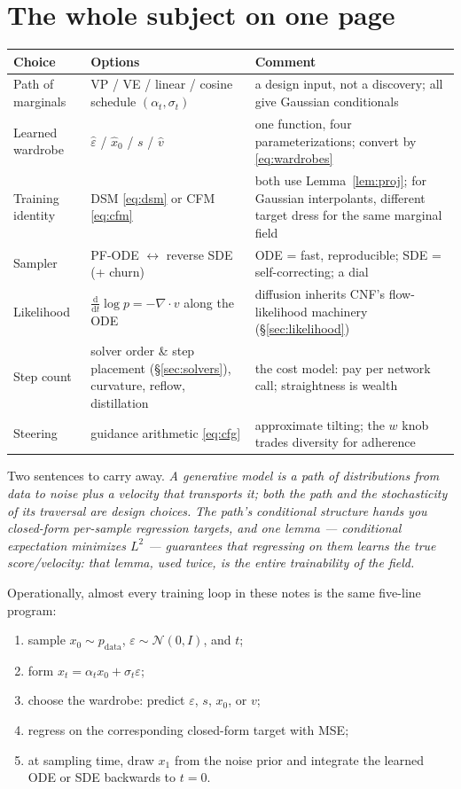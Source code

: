 \documentclass[10pt,a4paper]{article}
\newcommand{\dd}{\mathrm{d}}
\newcommand{\score}{s}
\newcommand{\veps}{\varepsilon}
\begin{document}
\section{The whole subject on one page}

\begin{center}
\small
\begin{tabular}{@{}p{3.0cm}p{5.3cm}p{5.6cm}@{}}
\toprule
Choice & Options & Comment \\
\midrule
Path of marginals & VP / VE / linear / cosine schedule $(\alpha_t,\sigma_t)$ & a design input, not a discovery; all give Gaussian conditionals \\
Learned wardrobe & $\hat\veps$ / $\hat x_0$ / $\score$ / $\hat v$ & one function, four parameterizations; convert by \eqref{eq:wardrobes} \\
Training identity & DSM \eqref{eq:dsm} or CFM \eqref{eq:cfm} & both use Lemma~\ref{lem:proj}; for Gaussian interpolants, different target dress for the same marginal field \\
Sampler & PF-ODE $\leftrightarrow$ reverse SDE (+ churn) & ODE = fast, reproducible; SDE = self-correcting; a dial \\
Likelihood & $\frac{\dd}{\dd t}\log p = -\nabla\!\cdot\!v$ along the ODE & diffusion inherits CNF's flow-likelihood machinery (\S\ref{sec:likelihood}) \\
Step count & solver order \& step placement (\S\ref{sec:solvers}), curvature, reflow, distillation & the cost model: pay per network call; straightness is wealth \\
Steering & guidance arithmetic \eqref{eq:cfg} & approximate tilting; the $w$ knob trades diversity for adherence \\
\bottomrule
\end{tabular}
\end{center}

\medskip
Two sentences to carry away. \emph{A generative model is a path of distributions from data to
noise plus a velocity that transports it; both the path and the
stochasticity of its traversal are design choices.} \emph{The path's
conditional structure hands you closed-form per-sample regression targets,
and one lemma --- conditional expectation minimizes $L^2$ --- guarantees
that regressing on them learns the true score/velocity: that lemma,
used twice, is the entire trainability of the field.}

\medskip
Operationally, almost every training loop in these notes is the same
five-line program:
\begin{enumerate}
\item sample $x_0 \sim p_{\mathrm{data}}$, $\veps \sim \mathcal{N}(0,I)$,
and $t$;
\item form $x_t = \alpha_t x_0 + \sigma_t \veps$;
\item choose the wardrobe: predict $\veps$, $\score$, $x_0$, or $v$;
\item regress on the corresponding closed-form target with MSE;
\item at sampling time, draw $x_1$ from the noise prior and integrate the
learned ODE or SDE backwards to $t=0$.
\end{enumerate}
\end{document}
